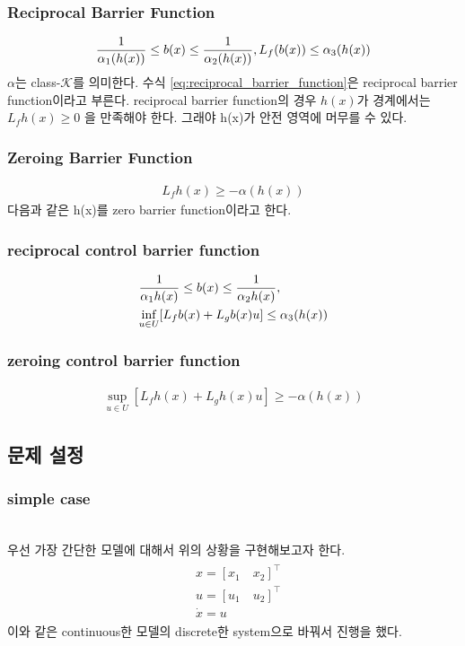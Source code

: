 \documentclass[journal]{IEEEtran}
\begin{document}
	\subsubsection{Reciprocal Barrier Function}
	\begin{align}
		{1 \over \alpha_1(h(x))} \leq b(x) \leq {1\over \alpha_2(h(x))} , L_f(b(x))\leq \alpha_3(h(x))	
		\label{eq:reciprocal_barrier_function} 
	\end{align}
	$\alpha$는 class-$\mathcal{K}$를 의미한다. 수식 \eqref{eq:reciprocal_barrier_function}은 reciprocal barrier function이라고 부른다.
	reciprocal barrier function의 경우 $h(x)$가 경계에서는 $L_f h(x) \geq0$ 을 만족해야 한다. 그래야 h(x)가 안전 영역에 머무를 수 있다.
	
	\subsubsection{Zeroing Barrier Function}
	\begin{align}
		L_fh(x)\geq-\alpha(h(x))	
		\label{eq:zero_barrier_function}
	\end{align}
	다음과 같은 h(x)를 zero barrier function이라고 한다. 
	
	\subsubsection{reciprocal control barrier function}
	\begin{align}
		& {1 \over{\alpha_1h(x)}}\leq b(x)\leq{{1 \over{\alpha_2h(x)}}},\nonumber\\
		& \underset{u\in U}{\inf}[L_fb(x)+L_gb(x)u]\leq \alpha_3(h(x))
	\end{align}
	
	\subsubsection{zeroing control barrier function }
	\begin{align}
		\underset{u\in U}{\sup}[L_fh(x)+L_gh(x)u]\geq -\alpha(h(x))
	\end{align}
	
	
	\subsection{문제 설정}

	\subsubsection{simple case}
	\mbox{}\\
	우선 가장 간단한 모델에 대해서 위의 상황을 구현해보고자 한다.
	\begin{align}
		\begin{split}
		& x=[x_{1}\quad x_{2}]^\top\\
		& u=[u_{1}\quad u_{2}]^\top\\
		& \dot{x}=u
		\end{split}
		\label{eq:simple_case_continuous}
	\end{align}
	이와 같은 continuous한 모델의 discrete한 system으로 바꿔서 진행을 했다.
	
\end{document}
